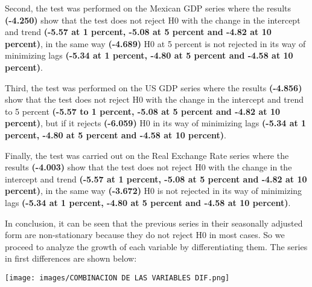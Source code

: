 \documentclass[12pt,english, spanish]{smfart}
\begin{document}
Second, the test was performed on the Mexican GDP series where the results \textbf{(-4.250)} show that the test does not reject H0 with the change in the intercept and trend \textbf{(-5.57 at 1 percent, -5.08 at 5 percent and -4.82 at 10 percent)}, in the same way \textbf{(-4.689)} H0 at 5 percent is not rejected in its way of minimizing lags \textbf{(-5.34 at 1 percent, -4.80 at 5 percent and -4.58 at 10 percent)}.\par
Third, the test was performed on the US GDP series where the results \textbf{(-4.856)} show that the test does not reject H0 with the change in the intercept and trend to 5 percent \textbf{(-5.57 to 1 percent, -5.08 at 5 percent and -4.82 at 10 percent)}, but if it rejects \textbf{(-6.059)} H0 in its way of minimizing lags \textbf{(-5.34 at 1 percent, -4.80 at 5 percent and -4.58 at 10 percent)}.\par
Finally, the test was carried out on the Real Exchange Rate series where the results \textbf{(-4.003)} show that the test does not reject H0 with the change in the intercept and trend \textbf{(-5.57 at 1 percent, -5.08 at 5 percent and -4.82 at 10 percent)}, in the same way \textbf{(-3.672)} H0 is not rejected in its way of minimizing lags \textbf{(-5.34 at 1 percent, -4.80 at 5 percent and -4.58 at 10 percent)}.\par
In conclusion, it can be seen that the previous series in their seasonally adjusted form are non-stationary because they do not reject H0 in most cases. So we proceed to analyze the growth of each variable by differentiating them. The series in first differences are shown below:\par
 
   \texttt{[image: images/COMBINACION DE LAS VARIABLES DIF.png]}
   
\end{document}
